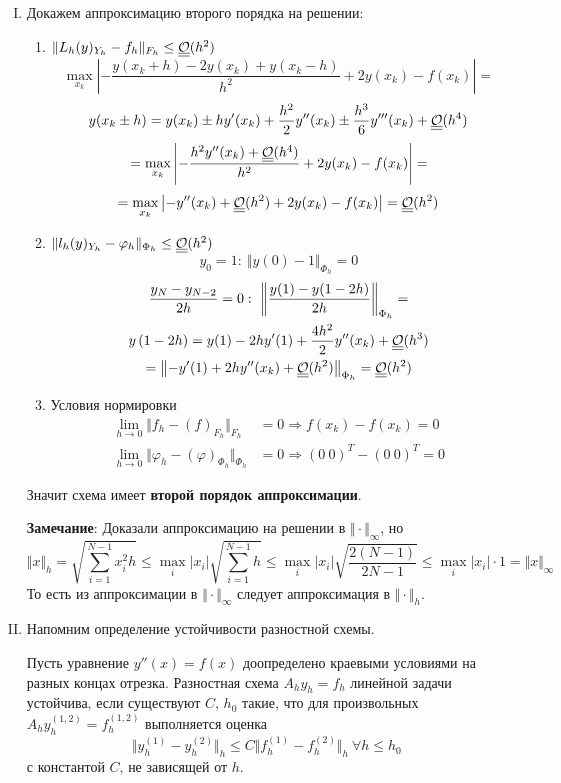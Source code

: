 \begin{task}
  \begin{enumerate}[I.]
    \item Докажем аппроксимацию второго порядка на решении:
          \begin{enumerate}
            \item $\Vert L_h(y)_{Y_h}-f_h\Vert_{F_h}\leq\underline{\underline{\mathcal{O}}}(h^2)$
                  \[\max_{x_k}\left|-\frac{y(x_k+h)-2y(x_k)+y(x_k-h)}{h^2}+2y(x_k)-f(x_k)\right|=\]
                  \[y(x_k\pm h)=y(x_k)\pm hy'(x_k)+\frac{h^2}{2}y''(x_k)\pm\frac{h^3}{6}y'''(x_k)+\underline{\underline{\mathcal{O}}}(h^4)\]
                  \[=\max_{x_k}\left|-\frac{h^2y''(x_k)+\underline{\underline{\mathcal{O}}}(h^4)}{h^2}+2y(x_k)-f(x_k)\right|=\]
                  \[=\max_{x_k}\left|-y''(x_k)+\underline{\underline{\mathcal{O}}}(h^2)+2y(x_k)-f(x_k)\right|=\underline{\underline{\mathcal{O}}}(h^2)\]
            \item $\Vert l_h(y)_{Y_h}-\varphi_h\Vert_{\Phi_h}\leq\underline{\underline{\mathcal{O}}}(h^2)$
                  \[y_0 = 1:\ \Vert y(0)-1\Vert_{\Phi_h}=0\]
                  \begin{multline*}
                    \frac{y_N - y_{N-2}}{2h} = 0:\ \norm{\frac{y(1)-y(1-2h)}{2h}}_{\Phi_h}= \\
                    y\left(1-2h\right)=y(1)-2hy'(1)+\frac{4h^2}{2}y''(x_k)+\bigO(h^3) \\
                    =\norm{-y'(1)+2hy''(x_k)+\bigO(h^2)}_{\Phi_h}=\bigO(h^2)
                  \end{multline*}
            \item Условия нормировки
                  \begin{align*}
                    \lim_{h\rightarrow0}\Vert f_h-(f)_{F_h}\Vert_{F_h}                   & =0 \Rightarrow f(x_k)-f(x_k) = 0       \\
                    \lim_{h\rightarrow0}\Vert \varphi_h-(\varphi)_{\Phi_h}\Vert_{\Phi_h} & =0 \Rightarrow (0\ 0)^T - (0\ 0)^T = 0
                  \end{align*}
          \end{enumerate}
          Значит схема имеет \textbf{второй порядок аппроксимации}.

          \textbf{Замечание}: Доказали аппроксимацию на решении в $\Vert\cdot\Vert_{\infty}$, но
          \[\Vert x\Vert_h=\sqrt{\sum_{i=1}^{N-1}x_i^2h}\leq\max_i|x_i|\sqrt{\sum_{i=1}^{N-1}h}\leq\max_i|x_i|\sqrt{\frac{2(N-1)}{2N-1}}\leq\max_i|x_i|\cdot1=\Vert x\Vert_{\infty}\]
          То есть из аппроксимации в $\Vert\cdot\Vert_{\infty}$ следует аппроксимация в $\Vert\cdot\Vert_h$.

          \newpage

    \item Напомним определение устойчивости разностной схемы.
          \begin{definition}
            Пусть уравнение $y''(x)=f(x)$ доопределено краевыми
            условиями на разных концах отрезка. Разностная схема
            $A_hy_h = f_h$ линейной задачи устойчива, если существуют $C$, $h_0$ такие, что для
            произвольных $A_hy^{(1,2)}_h = f^{(1,2)}_h$ выполняется оценка
            \[\Vert y^{(1)}_h-y^{(2)}_h\Vert_h\leq C\Vert f^{(1)}_h -f^{(2)}_h\Vert_h\ \forall h\leq h_0\]
            с константой $C$, не зависящей от $h$.
          \end{definition}


\end{enumerate}
\end{task}
